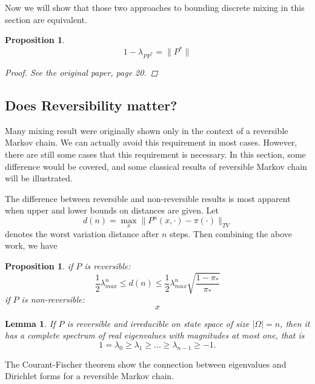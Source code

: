 \documentclass[12pt,reqno]{amsart}
\newtheorem{lem}[thm]{Lemma}
\newtheorem{prop}[thm]{Proposition}
\begin{document}
Now we will show that those two approaches to bounding discrete mixing in this section are equivalent.
\begin{prop}
  \begin{equation}
    \label{eq:two_same}
    1 - \lambda_{PP^*} = \|P^* \|
  \end{equation}
    \begin{proof}
      See the original paper, page 20.
    \end{proof}

\end{prop}


\subsection{Does Reversibility matter?}
Many mixing result were originally shown only in the context of a reversible Markov chain. We can actually avoid this requirement in most cases. However, there are still some cases that this requirement is necessary. In this section, some difference would be covered, and some classical results of reversible Markov chain will be illustrated.

The difference between reversible and non-reversible results is most apparent when upper and lower bounds on distances are given. Let
$$ d(n) = \max_x\|P^n(x,\cdot)-\pi(\cdot) \|_{TV}
$$
denotes the worst variation distance after $n$ steps. Then combining the above work, we have
\begin{prop}
  if $P$ is reversible:
  \begin{equation}
   \frac{1}{2}\lambda^n_{max} \leq d(n) \leq \frac{1}{2}\lambda^n_{max} \sqrt{\frac{1-\pi_*}{\pi_*}}     
  \end{equation}
if $P$ is non-reversible:
  \begin{equation}
    x
  \end{equation}
\end{prop}

\begin{lem}
  If $P$ is reversible and irreducible on state space of size $|\Omega|=n$, then it has a complete spectrum of real eigenvalues with magnitudes at most one, that is
  \begin{equation}
    \label{eq:eigenvalue}
    1 = \lambda_0 \geq \lambda_1 \geq \ldots \geq \lambda_{n-1} \geq -1.
  \end{equation}
\end{lem}

The Courant-Fischer theorem show the connection between eigenvalues and 
Dirichlet forms for a reversible Markov chain.
\end{document}
